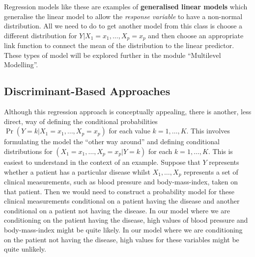 \documentclass[
]{article}
\begin{document}
Regression models like these are examples of \textbf{generalised linear
models} which generalise the linear model to allow the \emph{response
variable} to have a non-normal distribution. All we need to do to get
another model from this class is choose a different distribution for
\(Y | X_1 = x_1, \ldots, X_p = x_p\) and then choose an appropriate link
function to connect the mean of the distribution to the linear
predictor. These types of model will be explored further in the module
``Multilevel Modelling''.

\hypertarget{discriminant-based-approaches}{%
\subsection{Discriminant-Based
Approaches}\label{discriminant-based-approaches}}

Although this regression approach is conceptually appealing, there is
another, less direct, way of defining the conditional probabilities
\(\Pr(Y = k | X_1 = x_1, \ldots, X_p = x_p)\) for each value
\(k = 1,\ldots,K\). This involves formulating the model the ``other way
around'' and defining conditional distributions for
\((X_1 = x_1, \ldots, X_p = x_p | Y = k)\) for each \(k=1,\ldots,K\).
This is easiest to understand in the context of an example. Suppose that
\(Y\) represents whether a patient has a particular disease whilst
\(X_1, \ldots, X_p\) represents a set of clinical measurements, such as
blood pressure and body-mass-index, taken on that patient. Then we would
need to construct a probability model for these clinical measurements
conditional on a patient having the disease and another conditional on a
patient not having the disease. In our model where we are conditioning
on the patient having the disease, high values of blood pressure and
body-mass-index might be quite likely. In our model where we are
conditioning on the patient not having the disease, high values for
these variables might be quite unlikely.
\end{document}

